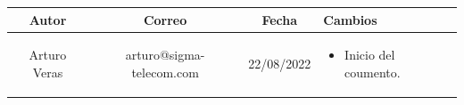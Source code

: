 \documentclass[12pt,twoside,onecolumn]{article}
\begin{document}
\begin{center}
\begin{tabular}{||c | c |c | |m{5cm}||} 
 \hline
Autor & Correo & Fecha & Cambios \\ [0.5ex] 
\hline
 \hline
 Arturo Veras &arturo@sigma-telecom.com &  22/08/2022 & 
 \begin{itemize}
 \setlength\itemsep{-0.1em}
      \item Inicio del coumento.
 \end{itemize}
 \\ 
\hline

\end{tabular}
\end{center}

\newpage


{}
\end{document}
